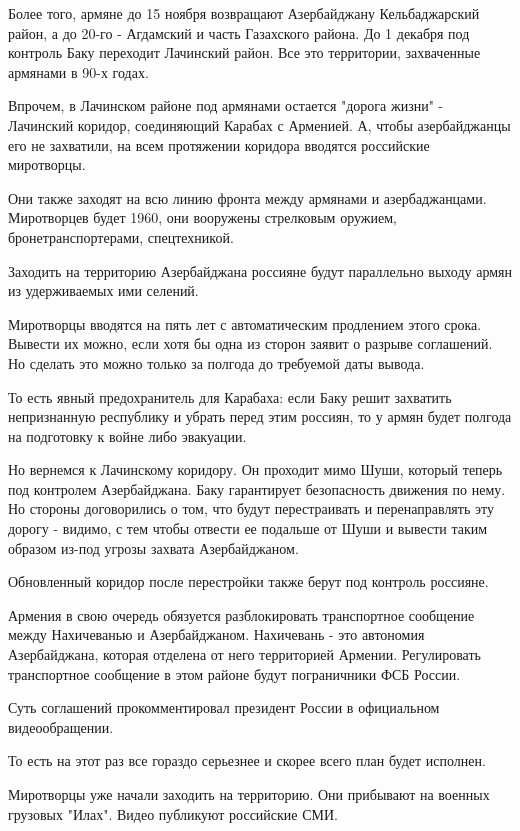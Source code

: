 Более того, армяне до 15 ноября возвращают Азербайджану Кельбаджарский район, а
до 20-го - Агдамский и часть Газахского района. До 1 декабря под контроль Баку
переходит Лачинский район. Все это территории, захваченные армянами в 90-х
годах.  

Впрочем, в Лачинском районе под армянами остается "дорога жизни" - Лачинский
коридор, соединяющий Карабах с Арменией. А, чтобы азербайджанцы его не
захватили, на всем протяжении коридора вводятся российские миротворцы.

Они также заходят на всю линию фронта между армянами и азербаджанцами.
Миротворцев будет 1960, они вооружены стрелковым оружием, бронетранспортерами,
спецтехникой.

Заходить на территорию Азербайджана россияне будут параллельно выходу армян из
удерживаемых ими селений. 

Миротворцы вводятся на пять лет с автоматическим продлением этого срока.
Вывести их можно, если хотя бы одна из сторон заявит о разрыве соглашений. Но
сделать это можно только за полгода до требуемой даты вывода.

То есть явный предохранитель для Карабаха: если Баку решит захватить
непризнанную республику и убрать перед этим россиян, то у армян будет полгода
на подготовку к войне либо эвакуации. 

Но вернемся к Лачинскому коридору. Он проходит мимо Шуши, который теперь под
контролем Азербайджана. Баку гарантирует безопасность движения по нему. Но
стороны договорились о том, что будут перестраивать и перенаправлять эту дорогу
- видимо, с тем чтобы отвести ее подальше от Шуши и вывести таким образом
из-под угрозы захвата Азербайджаном.

Обновленный коридор после перестройки также берут под контроль россияне. 

Армения в свою очередь обязуется разблокировать транспортное сообщение между
Нахичеванью и Азербайджаном. Нахичевань - это автономия Азербайджана, которая
отделена от него территорией Армении. Регулировать транспортное сообщение в
этом районе будут пограничники ФСБ России. 

Суть соглашений прокомментировал президент России в официальном видеообращении.

То есть на этот раз все гораздо серьезнее и скорее всего план будет исполнен. 

Миротворцы уже начали заходить на территорию. Они прибывают на военных грузовых
"Илах". Видео публикуют российские СМИ. 


